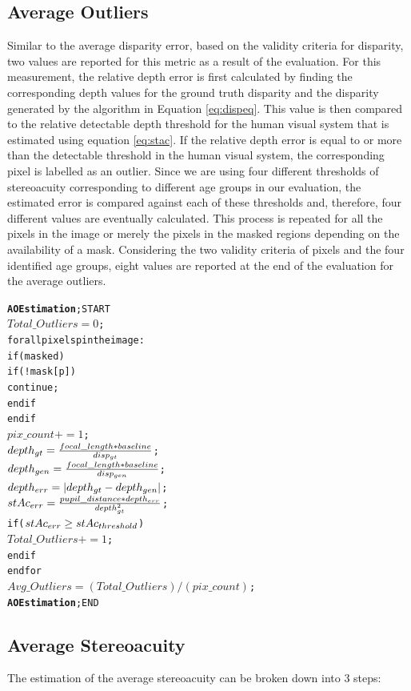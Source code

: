 \subsection{Average Outliers}
Similar to the average disparity error, based on the validity criteria for disparity, 
two values are reported for this metric as a result of the evaluation. For this measurement, the relative depth error is first calculated by finding the corresponding depth values
for the ground truth disparity and the disparity generated by the algorithm in Equation \ref{eq:dispeq}. This value is then compared to the relative 
detectable depth threshold for the human visual system that is estimated using
equation \ref{eq:stac}. If the relative depth error is equal to or more than the detectable threshold in the human visual system,
the corresponding pixel is labelled as an outlier. Since we are using four different thresholds of stereoacuity corresponding to different
age groups in our evaluation, the estimated error is compared against each of these thresholds and, therefore,
four different values are eventually calculated. This process is repeated for all the pixels in the image or 
merely the pixels in the masked regions depending on the availability of a mask.
Considering the two validity criteria of pixels and the four identified age groups, 
eight values are reported at the end of the evaluation for the average outliers.

\begin{alltt}
\textbf{AO Estimation}; START
   \(Total\_Outliers = 0\);
   for all pixels p in the image:
         if (masked)
            if(!mask[p])
               continue;
            end if
         end if
         \(pix\_count += 1\);
         \(depth\sb{gt} = \frac{focal\_length * baseline}{disp\sb{gt}}\);
         \(depth\sb{gen} = \frac{focal\_length * baseline}{disp\sb{gen}}\);
         \(depth\sb{err} = |depth\sb{gt}-depth\sb{gen}|\);
         \(stAc\sb{err} = \frac{pupil\_distance*depth\sb{err}}{depth\sb{gt}\sp{2}}\);
         if (\(stAc\sb{err} \geq stAc\sb{threshold}\))
            \(Total\_Outliers += 1\);
         end if
   end for
   \(Avg\_Outliers = (Total\_Outliers)/(pix\_count)\);
\textbf{AO Estimation}; END
\end{alltt}

\subsection{Average Stereoacuity}
The estimation of the average stereoacuity can be broken down into 3 steps:

